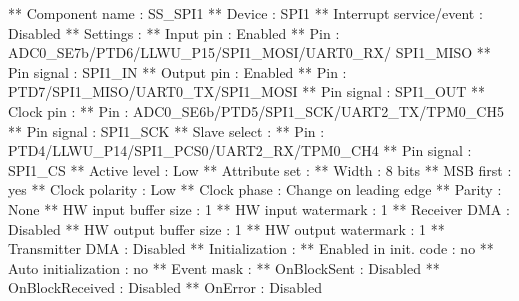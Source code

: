 \begin{DoxyCode}
**          Component name                                 : SS\_SPI1
**          Device                                         : SPI1
**          Interrupt service/\textcolor{keyword}{event}                        : Disabled
**          Settings                                       : 
**            Input pin                                    : Enabled
**              Pin                                        : ADC0\_SE7b/PTD6/LLWU\_P15/SPI1\_MOSI/UART0\_RX/
      SPI1\_MISO
**              Pin signal                                 : SPI1\_IN
**            Output pin                                   : Enabled
**              Pin                                        : PTD7/SPI1\_MISO/UART0\_TX/SPI1\_MOSI
**              Pin signal                                 : SPI1\_OUT
**            Clock pin                                    : 
**              Pin                                        : ADC0\_SE6b/PTD5/SPI1\_SCK/UART2\_TX/TPM0\_CH5
**              Pin signal                                 : SPI1\_SCK
**            Slave select                                 : 
**              Pin                                        : PTD4/LLWU\_P14/SPI1\_PCS0/UART2\_RX/TPM0\_CH4
**              Pin signal                                 : SPI1\_CS
**              Active level                               : Low
**            Attribute set                                : 
**              Width                                      : 8 bits
**              MSB first                                  : yes
**              Clock polarity                             : Low
**              Clock phase                                : Change on leading edge
**              Parity                                     : None
**            HW input buffer size                         : 1
**            HW input watermark                           : 1
**            Receiver DMA                                 : Disabled
**            HW output buffer size                        : 1
**            HW output watermark                          : 1
**            Transmitter DMA                              : Disabled
**          Initialization                                 : 
**            Enabled in init. code                        : no
**            Auto initialization                          : no
**            Event mask                                   : 
**              OnBlockSent                                : Disabled
**              OnBlockReceived                            : Disabled
**              OnError                                    : Disabled
\end{DoxyCode}
